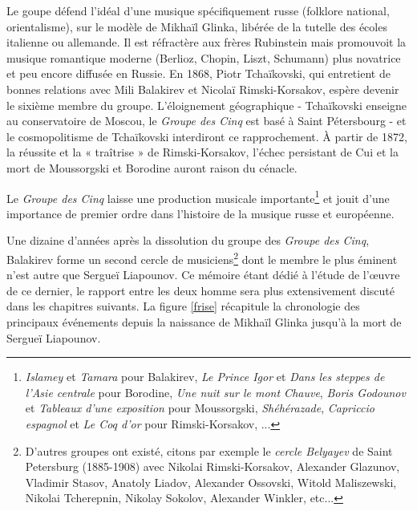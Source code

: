 Le goupe défend l'idéal d'une musique spécifiquement russe (folklore national, orientalisme), sur le modèle de Mikhaïl Glinka, libérée de la tutelle des écoles italienne ou allemande. Il est réfractère aux frères Rubinstein mais promouvoit la musique romantique moderne (Berlioz, Chopin, Liszt, Schumann) plus novatrice et peu encore diffusée en Russie. En 1868, Piotr Tchaïkovski, qui entretient de bonnes relations avec Mili Balakirev et Nicolaï Rimski-Korsakov, espère devenir le sixième membre du groupe. L'éloignement géographique - Tchaïkovski enseigne au conservatoire de Moscou, le \emph{Groupe des Cinq} est basé à Saint Pétersbourg - et le cosmopolitisme de Tchaïkovski interdiront ce rapprochement. À partir de 1872, la réussite et la « traîtrise » de Rimski-Korsakov, l'échec persistant de Cui et la mort de Moussorgski et Borodine auront raison du cénacle.

Le \emph{Groupe des Cinq} laisse une production musicale importante\footnote{\emph{Islamey} et \emph{Tamara} pour Balakirev, \emph{Le Prince Igor} et \emph{Dans les steppes de l'Asie centrale} pour Borodine, \emph{Une nuit sur le mont Chauve}, \emph{Boris Godounov} et \emph{Tableaux d'une exposition} pour Moussorgski, \emph{Shéhérazade}, \emph{Capriccio espagnol} et \emph{Le Coq d'or} pour Rimski-Korsakov, ...} et jouit d'une importance de premier ordre dans l'histoire de la musique russe et européenne.

Une dizaine d'années après la dissolution du groupe des \emph{Groupe des Cinq}, Balakirev forme un second cercle de musiciens\footnote{D'autres groupes ont existé, citons par exemple le \emph{cercle Belyayev} de Saint Petersburg (1885-1908) avec Nikolai Rimski-Korsakov, Alexander Glazunov, Vladimir Stasov, Anatoly Liadov, Alexander Ossovski, Witold Maliszewski, Nikolai Tcherepnin, Nikolay Sokolov, Alexander Winkler, etc... } dont le membre le plus éminent n'est autre que Sergueï Liapounov. Ce mémoire étant dédié à l'étude de l'œuvre de ce dernier, le rapport entre les deux homme sera plus extensivement discuté dans les chapitres suivants. La figure \ref{frise} récapitule la chronologie des principaux événements depuis la naissance de Mikhaïl Glinka jusqu'à la mort de Sergueï Liapounov.

